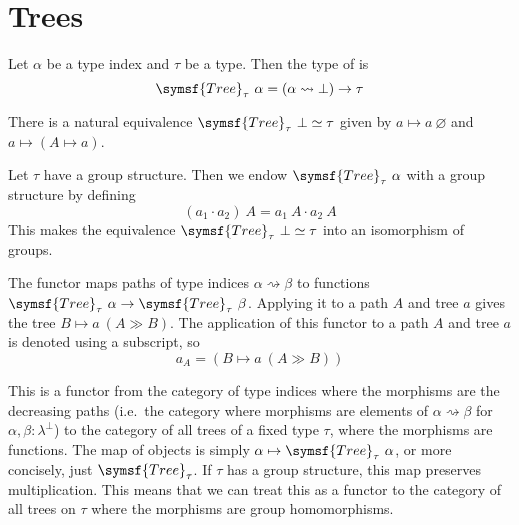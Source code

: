 \section{Trees}

\begin{definition}
    Let \( \alpha \) be a type index and \( \tau \) be a type.
    Then the type of  is
    \[ \symsf{Tree}_\tau\ \alpha = (\alpha \rightsquigarrow \bot) \to \tau \]
\end{definition}
\begin{definition}
    \label{def:tree_ofBot}
    There is a natural equivalence \( \symsf{Tree}_\tau\ \bot \simeq \tau \) given by \( a \mapsto a\ \varnothing \) and \( a \mapsto (A \mapsto a) \).
\end{definition}
\begin{definition}
    Let \( \tau \) have a group structure.
    Then we endow \( \symsf{Tree}_\tau\ \alpha \) with a group structure by defining
    \[ (a_1 \cdot a_2)\ A = a_1\ A \cdot a_2\ A \]
    This makes the equivalence \( \symsf{Tree}_\tau\ \bot \simeq \tau \) into an isomorphism of groups.
\end{definition}
\begin{definition}
    \label{def:derivative}
    The  functor maps paths of type indices \( \alpha \rightsquigarrow \beta \) to functions \( \symsf{Tree}_\tau\ \alpha \to \symsf{Tree}_\tau\ \beta \).
    Applying it to a path \( A \) and tree \( a \) gives the tree \( B \mapsto a\ (A \gg B) \).
    The application of this functor to a path \( A \) and tree \( a \) is denoted using a subscript, so
    \[ a_A = (B \mapsto a\ (A \gg B)) \]
\end{definition}
\begin{remark}
    This is a functor from the category of type indices where the morphisms are the decreasing paths (i.e.\ the category where morphisms are elements of \( \alpha \rightsquigarrow \beta \) for \( \alpha, \beta : \lambda^\bot \)) to the category of all trees of a fixed type \( \tau \), where the morphisms are functions.
    The map of objects is simply \( \alpha \mapsto \symsf{Tree}_\tau\ \alpha \), or more concisely, just \( \symsf{Tree}_\tau \).
    If \( \tau \) has a group structure, this map preserves multiplication.
    This means that we can treat this as a functor to the category of all trees on \( \tau \) where the morphisms are group homomorphisms.
\end{remark}
